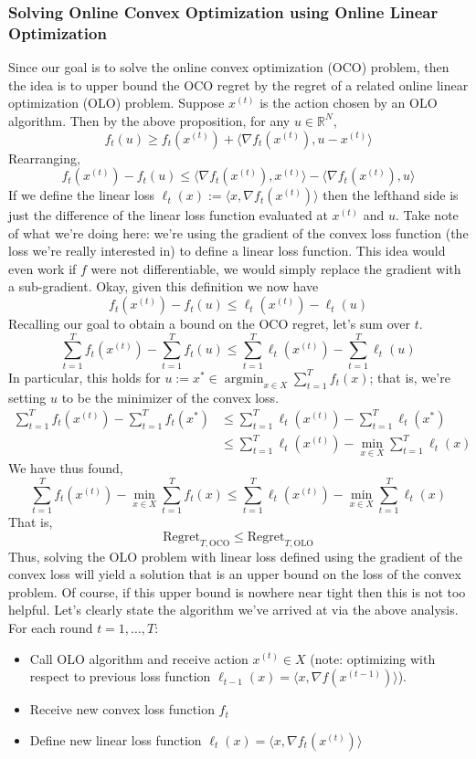 \documentclass[12pt]{article}
\newcommand{\R}{\mathcal{R}}
\DeclareMathOperator*{\argmin}{argmin}
\def\R{\mathbb{R}}
\begin{document}
\subsubsection{Solving Online Convex Optimization using Online Linear Optimization}
Since our goal is to solve the online convex optimization (OCO) problem, then the idea is to upper bound the OCO regret by the regret of a related online linear optimization (OLO) problem. 
Suppose $x^{(t)}$ is the action chosen by an OLO algorithm. Then by the above proposition, for any $u \in \R^N$, 
\[f_t(u) \geq f_t(x^{(t)}) + \langle \nabla f_t(x^{(t)}), u - x^{(t)}\rangle\]
Rearranging, 
\[f_t(x^{(t)}) - f_t(u) \leq \langle \nabla f_t(x^{(t)}), x^{(t)}\rangle - \langle \nabla f_t(x^{(t)}), u \rangle\]
If we define the linear loss $\ell_t(x) := \langle x, \nabla f_t(x^{(t)})\rangle$ then the lefthand side is just the difference of the linear loss function evaluated at $x^{(t)}$ and $u$. Take note of 
what we're doing here: we're using the gradient of the convex loss function (the loss we're really interested in) to define a linear loss function. This idea would even work if $f$ were not 
differentiable, we would simply replace the gradient with a sub-gradient. Okay, given this definition we now have
\[f_t(x^{(t)}) - f_t(u) \leq \ell_t(x^{(t)}) - \ell_t(u)\]
Recalling our goal to obtain a bound on the OCO regret, let's sum over $t$. 
\[\sum_{t = 1}^{T} f_t(x^{(t)}) - \sum_{t = 1}^{T} f_t(u) \leq \sum_{t = 1}^{T} \ell_t(x^{(t)}) - \sum_{t = 1}^{T} \ell_t(u)\]
In particular, this holds for $u := x^* \in \argmin_{x \in X} \sum_{t = 1}^{T} f_t(x)$; that is, we're setting $u$ to be the minimizer of the convex loss.
\begin{align*} 
\sum_{t = 1}^{T} f_t(x^{(t)}) - \sum_{t = 1}^{T} f_t(x^*) &\leq \sum_{t = 1}^{T} \ell_t(x^{(t)}) - \sum_{t = 1}^{T} \ell_t(x^*) \\
									  	&\leq \sum_{t = 1}^{T} \ell_t(x^{(t)}) - \min_{x \in X} \sum_{t = 1}^{T} \ell_t(x)
\end{align*}
We have thus found,
\[\sum_{t = 1}^{T} f_t(x^{(t)}) - \min_{x \in X} \sum_{t = 1}^{T} f_t(x) \leq \sum_{t = 1}^{T} \ell_t(x^{(t)}) - \min_{x \in X} \sum_{t = 1}^{T} \ell_t(x)\]
That is, 
\[\text{Regret}_{T, \text{OCO}} \leq \text{Regret}_{T, \text{OLO}}\]
Thus, solving the OLO problem with linear loss defined using the gradient of the convex loss will yield a solution that is an upper bound on the loss of the convex problem. Of course, if this 
upper bound is nowhere near tight then this is not too helpful. Let's clearly state the algorithm we've arrived at via the above analysis. 
For each round $t = 1, \dots, T$:
\begin{itemize}
\item Call OLO algorithm and receive action $x^{(t)} \in X$ (note: optimizing with respect to previous loss function $\ell_{t - 1}(x) = \langle x, \nabla f(x^{(t - 1)}) \rangle $). 
\item Receive new convex loss function $f_t$
\item Define new linear loss function $\ell_t(x) = \langle x, \nabla f_t(x^{(t)})\rangle$
\end{itemize}
\end{document}
